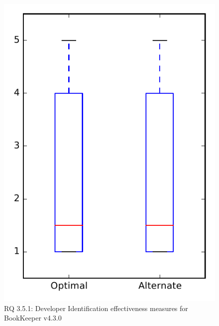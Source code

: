 
\begin{figure}
\centering
\includegraphics[height=0.4\textheight]{figures/combo/dit_rq1_bookkeeper}
\caption{RQ 3.5.1: Developer Identification effectiveness measures for BookKeeper v4.3.0}
\label{fig:dit:rq1:bookkeeper}
\end{figure}
